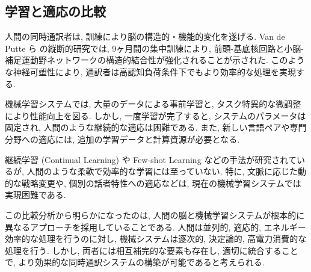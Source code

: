 \subsection{学習と適応の比較}

人間の同時通訳者は, 訓練により脳の構造的・機能的変化を遂げる.
Van de Putte ら \cite{vandeputte2018anatomical} の縦断的研究では, 9ヶ月間の集中訓練により, 前頭-基底核回路と小脳-補足運動野ネットワークの構造的結合性が強化されることが示された.
このような神経可塑性により, 通訳者は高認知負荷条件下でもより効率的な処理を実現する.

機械学習システムでは, 大量のデータによる事前学習と, タスク特異的な微調整により性能向上を図る.
しかし, 一度学習が完了すると, システムのパラメータは固定され, 人間のような継続的な適応は困難である.
また, 新しい言語ペアや専門分野への適応には, 追加の学習データと計算資源が必要となる.

継続学習 (Continual Learning) や Few-shot Learning などの手法が研究されているが, 人間のような柔軟で効率的な学習には至っていない.
特に, 文脈に応じた動的な戦略変更や, 個別の話者特性への適応などは, 現在の機械学習システムでは実現困難である.

この比較分析から明らかになったのは, 人間の脳と機械学習システムが根本的に異なるアプローチを採用していることである.
人間は並列的, 適応的, エネルギー効率的な処理を行うのに対し, 機械システムは逐次的, 決定論的, 高電力消費的な処理を行う.
しかし, 両者には相互補完的な要素も存在し, 適切に統合することで, より効果的な同時通訳システムの構築が可能であると考えられる.